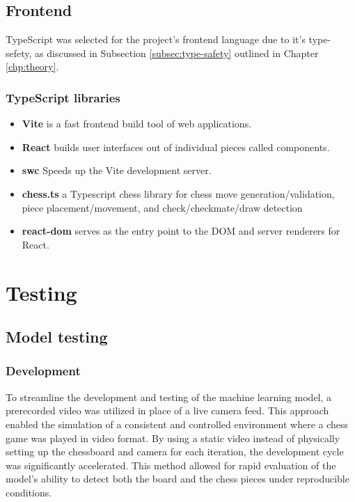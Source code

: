 \subsection*{Frontend}

TypeScript was selected for the project's frontend language due to it's type-sefety, as discussed in Subsection \ref{subsec:type-safety} outlined in Chapter \ref{chp:theory}.

\subsubsection*{TypeScript libraries}

\begin{itemize}
    \item \textbf{Vite} is a fast frontend build tool of web applications. \cite{ts:vite}
    
    \item \textbf{React} builds user interfaces out of individual pieces called components. \cite{ts:react}
    
    \item \textbf{\acrshort{swc}} Speeds up the Vite development server. \cite{ts:swc}
    
    \item \textbf{chess.ts} a Typescript chess library for chess move generation/validation, piece placement/movement, and check/checkmate/draw detection \cite{ts:chess}
    
    \item \textbf{react-dom} serves as the entry point to the DOM and server renderers for React. \cite{ts:react-dom}
\end{itemize}

\section{Testing}
\label{sec:testing}

\subsection{Model testing}
\label{subsec:model-testing}

\subsubsection*{Development}
To streamline the development and testing of the machine learning model, a prerecorded video was utilized in place of a live camera feed. This approach enabled the simulation of a consistent and controlled environment where a chess game was played in video format. By using a static video instead of physically setting up the chessboard and camera for each iteration, the development cycle was significantly accelerated. This method allowed for rapid evaluation of the model's ability to detect both the board and the chess pieces under reproducible conditions.

